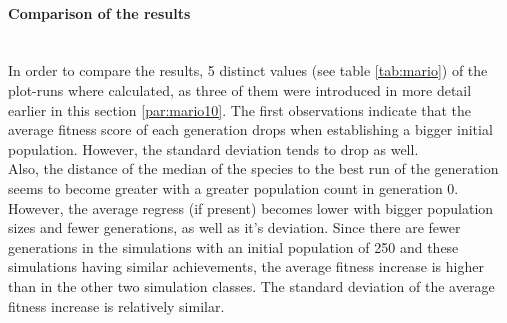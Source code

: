 		\paragraph{Comparison of the results}
			\begin{table}[h]
				\centering
				\caption{MarI/O Population Comparison Overview}
				\label{tab:mario}
			\end{table}
			 \\
			In order to compare the results, 5 distinct values (see table \ref{tab:mario}) of the plot-runs where calculated, as three of them were introduced in more detail earlier in this section \ref{par:mario10}. The first observations indicate that the average fitness score of each generation drops when establishing a bigger initial population. However, the standard deviation tends to drop as well. \\
			Also, the distance of the median of the species to the best run of the generation seems to become greater with a greater population count in generation 0. However, the average regress (if present) becomes lower with bigger population sizes and fewer generations, as well as it's deviation. Since there are fewer generations in the simulations with an initial population of 250 and these simulations having similar achievements, the average fitness increase is higher than in the other two simulation classes. The standard deviation of the average fitness increase is relatively similar.\\
